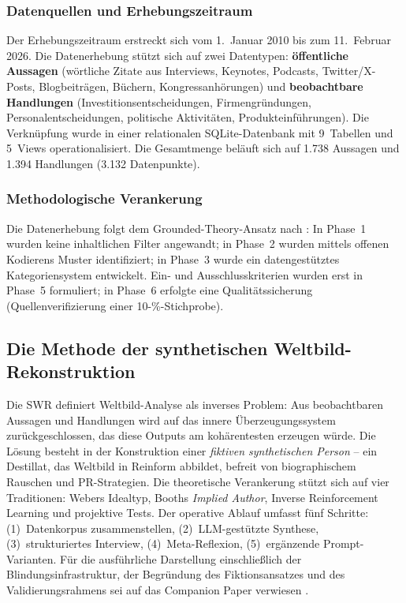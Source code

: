 \documentclass[12pt,a4paper]{article}
\begin{document}
\subsubsection{Datenquellen und Erhebungszeitraum}

Der Erhebungszeitraum erstreckt sich vom 1.~Januar 2010 bis zum 11.~Februar 2026. Die Datenerhebung st\"utzt sich auf zwei Datentypen: \textbf{\"offentliche Aussagen} (w\"ortliche Zitate aus Interviews, Keynotes, Podcasts, Twitter/X-Posts, Blogbeitr\"agen, B\"uchern, Kongressanh\"orungen) und \textbf{beobachtbare Handlungen} (Investitionsentscheidungen, Firmengr\"undungen, Personalentscheidungen, politische Aktivit\"aten, Produkteinf\"uhrungen). Die Verkn\"upfung wurde in einer relationalen SQLite-Datenbank mit 9~Tabellen und 5~Views operationalisiert. Die Gesamtmenge bel\"auft sich auf 1.738 Aussagen und 1.394 Handlungen (3.132 Datenpunkte).

\subsubsection{Methodologische Verankerung}

Die Datenerhebung folgt dem Grounded-Theory-Ansatz nach \citet{StraussCorbin1990}: In Phase~1 wurden keine inhaltlichen Filter angewandt; in Phase~2 wurden mittels offenen Kodierens Muster identifiziert; in Phase~3 wurde ein datengest\"utztes Kategoriensystem entwickelt. Ein- und Ausschlusskriterien wurden erst in Phase~5 formuliert; in Phase~6 erfolgte eine Qualit\"atssicherung (Quellenverifizierung einer 10-\%-Stichprobe).


\subsection{Die Methode der synthetischen Weltbild-Rekonstruktion}
\label{sec:methodik:swr}

Die SWR definiert Weltbild-Analyse als inverses Problem: Aus beobachtbaren Aussagen und Handlungen wird auf das innere \"Uberzeugungssystem zur\"uckgeschlossen, das diese Outputs am koh\"arentesten erzeugen w\"urde. Die L\"osung besteht in der Konstruktion einer \emph{fiktiven synthetischen Person} -- ein Destillat, das Weltbild in Reinform abbildet, befreit von biographischem Rauschen und PR-Strategien. Die theoretische Verankerung st\"utzt sich auf vier Traditionen: Webers Idealtyp, Booths \emph{Implied Author}, Inverse Reinforcement Learning und projektive Tests. Der operative Ablauf umfasst f\"unf Schritte: (1)~Datenkorpus zusammenstellen, (2)~LLM-gest\"utzte Synthese, (3)~strukturiertes Interview, (4)~Meta-Reflexion, (5)~erg\"anzende Prompt-Varianten. F\"ur die ausf\"uhrliche Darstellung einschlie\ss{}lich der Blindungsinfrastruktur, der Begr\"undung des Fiktionsansatzes und des Validierungsrahmens sei auf das Companion Paper verwiesen \citep{Geiger2026SWR}.
\end{document}
